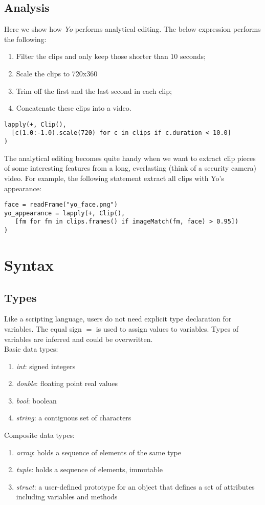 \documentclass[12pt]{article}
\begin{document}
\subsection{Analysis}
Here we show how \textit{Yo} performs analytical editing.
The below expression performs the following:
\begin{enumerate}[label=(\alph*)]
\item Filter the clips and only keep those shorter than 10 seconds;
\item Scale the clips to 720x360
\item Trim off the first and the last second in each clip;
\item Concatenate these clips into a video.
\end{enumerate}

\begin{lstlisting}[caption=Calculate based on videos]
lapply(+, Clip(), 
  [c(1.0:-1.0).scale(720) for c in clips if c.duration < 10.0]
)
\end{lstlisting}

The analytical editing becomes quite handy when we want to extract clip pieces of some interesting features from a long, everlasting (think of a security camera) video. For example, the following statement extract all clips with Yo's appearance:
\begin{lstlisting}[caption=Identify Yo's face :)]
face = readFrame("yo_face.png")
yo_appearance = lapply(+, Clip(), 
   [fm for fm in clips.frames() if imageMatch(fm, face) > 0.95])
)
\end{lstlisting}


\section{Syntax}
\subsection{Types}
Like a scripting language, users do not need explicit type declaration for variables. The equal sign $=$ is used to assign values to variables. Types of variables are inferred and could be overwritten.\\ 
Basic data types: 
\begin{enumerate}
\item \textit{int}: signed integers
\item \textit{double}: floating point real values 
\item \textit{bool}: boolean 
\item \textit{string}: a contiguous set of characters
\end{enumerate}
Composite data types:
\begin{enumerate}
\item \textit{array}: holds a sequence of elements of the same type
\item \textit{tuple}: holds a sequence of elements, immutable
\item \textit{struct}: a user-defined prototype for an object that defines a set of attributes including variables and methods
\end{enumerate}
\end{document}
